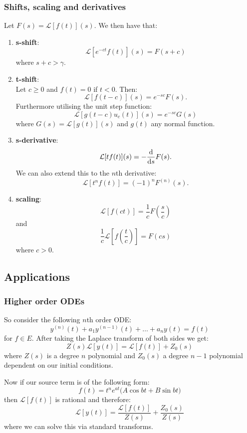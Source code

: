 \documentclass{article}
\begin{document}
\subsubsection{Shifts, scaling and derivatives}
Let $F(s)=\mathcal{L}[f(t)](s)$.
We then have that:
\begin{enumerate}
    \item \textbf{s-shift}:
    $$\mathcal{L}[e^{-ct}f(t)](s)=F(s+c)$$
    where $s+c>\gamma$.
    \item \textbf{t-shift}: \\
    Let $c\geq0$ and $f(t)=0$ if $t<0$. Then:
    $$\mathcal{L}[f(t-c)](s)=e^{-sc}F(s).$$
    Furthermore utilising the unit step function:
    $$\mathcal{L}[g(t-c)u_c(t)](s)=e^{-sc}G(s)$$
    where $G(s)=\mathcal{L}[g(t)](s)$
    and $g(t)$ any normal function.

    \item \textbf{s-derivative}:
    $$\mathcal{L}[tf(t)](s)=-\dv{s}F(s).$$
    We can also extend this to the $n$th derivative:
    $$\mathcal{L}[t^n f(t)]
    =(-1)^n F^{(n)}(s).$$

    \item \textbf{scaling}:
    $$\mathcal{L}[f(ct)]=\frac{1}{c}F(\frac{s}{c})$$
    and
    $$\frac{1}{c}\mathcal{L}[f(\frac{t}{c})]=F(cs)$$
    where $c>0$.
\end{enumerate}

\subsection{Applications}

\subsubsection{Higher order ODEs}
So consider the following $n$th order ODE:
$$y^{(n)}(t)+a_1y^{(n-1)}(t)+\dots
+a_n y(t)=f(t)$$
for $f\in E$. After taking the Laplace transform of both sides
we get:
$$Z(s)\mathcal{L}[y(t)]
=\mathcal{L}[f(t)]+Z_0(s)$$
where $Z(s)$ is a degree $n$ polynomial
and $Z_0(s)$ a degree $n-1$ polynomial dependent on our 
initial conditions.

Now if our source term is of the following form:
$$f(t)=t^n e^{at}\bigl(A\cos bt+B\sin bt\bigr)$$
then $\mathcal{L}[f(t)]$ is rational and therefore:
$$\mathcal{L}[y(t)]=\frac{\mathcal{L}[f(t)]}{Z(s)}+\frac{Z_0(s)}{Z(s)}$$
where we can solve this via standard transforms.

\newpage
\end{document}
